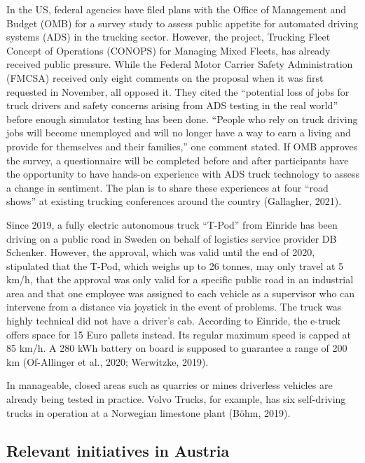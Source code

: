 \documentclass[
]{book}
\begin{document}
In the US, federal agencies have filed plans with the Office of Management and Budget (OMB) for a survey study to assess public appetite for automated driving systems (ADS) in the trucking sector. However, the project, Trucking Fleet Concept of Operations (CONOPS) for Managing Mixed Fleets, has already received public pressure. While the Federal Motor Carrier Safety Administration (FMCSA) received only eight comments on the proposal when it was first requested in November, all opposed it. They cited the ``potential loss of jobs for truck drivers and safety concerns arising from ADS testing in the real world'' before enough simulator testing has been done. ``People who rely on truck driving jobs will become unemployed and will no longer have a way to earn a living and provide for themselves and their families,'' one comment stated. If OMB approves the survey, a questionnaire will be completed before and after participants have the opportunity to have hands-on experience with ADS truck technology to assess a change in sentiment. The plan is to share these experiences at four ``road shows'' at existing trucking conferences around the country (Gallagher, 2021).

Since 2019, a fully electric autonomous truck ``T-Pod'' from Einride has been driving on a public road in Sweden on behalf of logistics service provider DB Schenker. However, the approval, which was valid until the end of 2020, stipulated that the T-Pod, which weighs up to 26 tonnes, may only travel at 5 km/h, that the approval was only valid for a specific public road in an industrial area and that one employee was assigned to each vehicle as a supervisor who can intervene from a distance via joystick in the event of problems. The truck was highly technical did not have a driver's cab. According to Einride, the e-truck offers space for 15 Euro pallets instead. Its regular maximum speed is capped at 85 km/h. A 280 kWh battery on board is supposed to guarantee a range of 200 km (Of-Allinger et al., 2020; Werwitzke, 2019).

In manageable, closed areas such as quarries or mines driverless vehicles are already being tested in practice. Volvo Trucks, for example, has six self-driving trucks in operation at a Norwegian limestone plant (Böhm, 2019).

\hypertarget{relevant-initiatives-in-austria-22}{%
\subsection*{Relevant initiatives in Austria}\label{relevant-initiatives-in-austria-22}}
\end{document}
